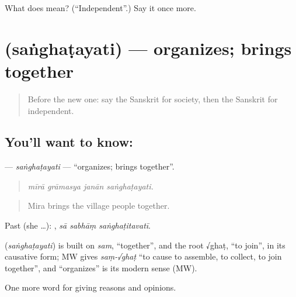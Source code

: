 \begin{tcolorbox}[breakable,colback=teal!4,colframe=teal!35!black,title={Before you move on}]
What does  mean? (\textquotedblleft{}Independent\textquotedblright{}.) Say it once more.
\end{tcolorbox}
\section[\texorpdfstring{\sk{संघटयति} (saṅghaṭayati)}{संघटयति (saṅghaṭayati)}]{ (saṅghaṭayati) — organizes; brings together}

\label{lesson:SA-C354-sanghatayati}



\begin{quote}
Before the new one: say the Sanskrit for society, then the Sanskrit for independent.
\end{quote}

\subsection*{You'll want to know: }
\textbf{} — \emph{saṅghaṭayati} — \textquotedblleft{}organizes; brings together\textquotedblright{}.

\begin{quote}
   
\end{quote}

\begin{quote}
\emph{mīrā grāmasya janān saṅghaṭayati.}
\end{quote}

\begin{quote}
Mira brings the village people together.
\end{quote}

Past (she …):   , \emph{sā sabhāṃ saṅghaṭitavatī}.

\begin{cousinweb}
\textbf{} (\emph{saṅghaṭayati}) is built on \emph{sam}, \textquotedblleft{}together\textquotedblright{}, and the root √ghaṭ, \textquotedblleft{}to join\textquotedblright{}, in its causative form; MW gives \emph{saṃ-√ghaṭ} \textquotedblleft{}to cause to assemble, to collect, to join together\textquotedblright{}, and \textquotedblleft{}organizes\textquotedblright{} is its modern sense (MW).
\end{cousinweb}

\begin{grammarlens}[title={What you've built}]
One more word for giving reasons and opinions.
\end{grammarlens}

